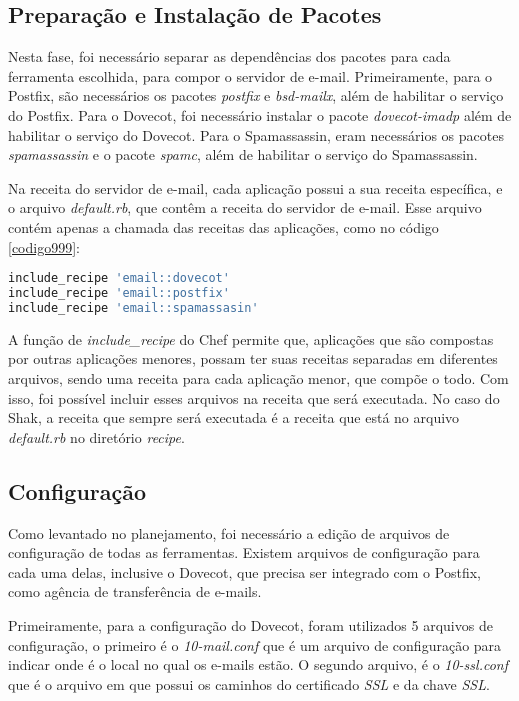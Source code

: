 \subsection{Preparação e Instalação de Pacotes }

Nesta fase, foi necessário separar as dependências dos pacotes para cada ferramenta
escolhida, para compor o servidor de e-mail. Primeiramente, para o Postfix, são necessários
os pacotes \textit{postfix} e \textit{bsd-mailx}, além de habilitar o serviço do 
Postfix. Para o Dovecot,
foi necessário instalar o pacote \textit{dovecot-imadp} além de habilitar o serviço do Dovecot. 
Para o Spamassassin, eram necessários os pacotes \textit{spamassassin} e o pacote
 \textit{spamc}, além de habilitar o serviço do Spamassassin.

Na receita do servidor de e-mail, cada aplicação possui a sua receita específica,
e o arquivo \textit{default.rb}, que contêm a receita do servidor de e-mail. Esse arquivo
contém apenas a chamada das receitas das aplicações, como no código \ref{codigo999}:

\begin{lstlisting}[language=Ruby,label=dice_index,caption={Exemplo da receita de email
composta pelas receitas das outras aplicações}, label=codigo999]
include_recipe 'email::dovecot'
include_recipe 'email::postfix'
include_recipe 'email::spamassasin'
\end{lstlisting}

A função de \textit{include\_recipe} do Chef permite que, aplicações que são compostas
por outras aplicações menores, possam ter suas receitas separadas em diferentes arquivos,
sendo uma receita para cada aplicação menor, que compõe o todo. Com isso, foi possível 
incluir esses arquivos na receita que será executada. No caso do Shak, a receita
que sempre será executada é a receita que está no arquivo \textit{default.rb} no diretório \textit{recipe}.

\subsection{Configuração}

Como levantado no planejamento, foi necessário a edição de arquivos de configuração
de todas as ferramentas. Existem arquivos de configuração para cada uma delas, inclusive
o Dovecot, que precisa ser integrado com o Postfix, como agência de transferência
de e-mails.

Primeiramente, para a configuração do Dovecot, foram utilizados 5 arquivos
de configuração, o primeiro é o \textit{10-mail.conf} que é um arquivo de configuração para
indicar onde é o local no qual os e-mails estão. O segundo arquivo, é o \textit{10-ssl.conf}
que é o arquivo em que possui os caminhos do certificado \textit{SSL} e da chave \textit{SSL}.

